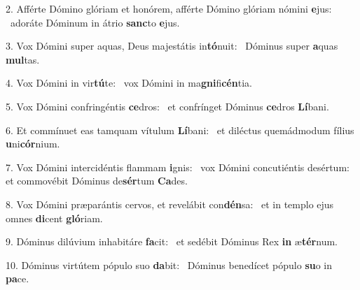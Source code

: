 2. Afférte Dómino glóriam et honórem, afférte Dómino glóriam nómini \textbf{e}jus: \ast\  adoráte Dóminum in átrio \textbf{sanc}to \textbf{e}jus.\

3. Vox Dómini super aquas, Deus majestátis in\textbf{tó}nuit: \ast\  Dóminus super \textbf{a}quas \textbf{mul}tas.\

4. Vox Dómini in vir\textbf{tú}te: \ast\  vox Dómini in ma\textbf{gni}fi\textbf{cén}tia.\

5. Vox Dómini confringéntis \textbf{ce}dros: \ast\  et confrínget Dóminus \textbf{ce}dros \textbf{Lí}bani.\

6. Et commínuet eas tamquam vítulum \textbf{Lí}bani: \ast\  et diléctus quemádmodum fílius \textbf{u}ni\textbf{cór}nium.\

7. Vox Dómini intercidéntis flammam \textbf{i}gnis: \ast\  vox Dómini concutiéntis desértum: et commovébit Dóminus de\textbf{sér}tum \textbf{Ca}des.\

8. Vox Dómini præparántis cervos, et revelábit con\textbf{dén}sa: \ast\  et in templo ejus omnes \textbf{di}cent \textbf{gló}riam.\

9. Dóminus dilúvium inhabitáre \textbf{fa}cit: \ast\  et sedébit Dóminus Rex \textbf{in} æ\textbf{tér}num.\

10. Dóminus virtútem pópulo suo \textbf{da}bit: \ast\  Dóminus benedícet pópulo \textbf{su}o in \textbf{pa}ce.\

